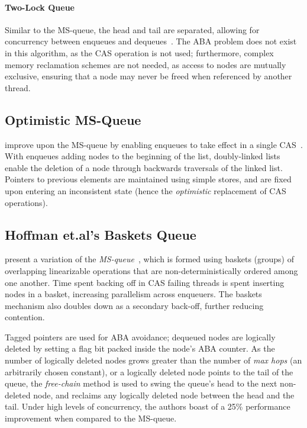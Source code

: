 \paragraph{Two-Lock Queue}
Similar to the MS-queue, the head and tail are separated, allowing for
concurrency between enqueues and dequeues~\citep{michael1996simple}. The ABA
problem does not exist in this algorithm, as the CAS operation is not used;
furthermore, complex memory reclamation schemes are not needed, as access to
nodes are mutually exclusive, ensuring that a node may never be freed when
referenced by another thread.

\subsection{Optimistic MS-Queue}
\citeauthor{ladan2008optimistic} improve upon the MS-queue by enabling enqueues
to take effect in a single CAS~\citep{ladan2008optimistic}.
With enqueues adding nodes to the beginning of the list,
doubly-linked lists enable the deletion of a node through backwards
traversals of the linked list.
Pointers to previous elements are maintained using simple stores, and are fixed
upon entering an inconsistent state (hence the \emph{optimistic} replacement of
CAS operations).

\subsection{Hoffman et.al's Baskets Queue}
\citeauthor{hoffman2007baskets} present a variation of the
\emph{MS-queue}~\citep{hoffman2007baskets}, which is formed using baskets
(groups) of overlapping linearizable operations that are non-deterministically
ordered among one another.
Time spent backing off in CAS failing threads is
spent inserting nodes in a basket, increasing parallelism across enqueuers.
The baskets mechanism also doubles down as a secondary back-off, further reducing contention.

Tagged pointers are used for ABA avoidance; dequeued nodes are logically
deleted by setting a flag bit packed inside the node's ABA counter. As the
number of logically deleted nodes grows greater than the number of \emph{max
hops} (an arbitrarily chosen constant), or a logically deleted node points to
the tail of the queue, the \emph{free-chain} method is used to swing the
queue's head to the next non-deleted node, and reclaims any logically deleted
node between the head and the tail. Under high levels of concurrency, the
authors boast of a 25\% performance improvement when compared to the MS-queue.

